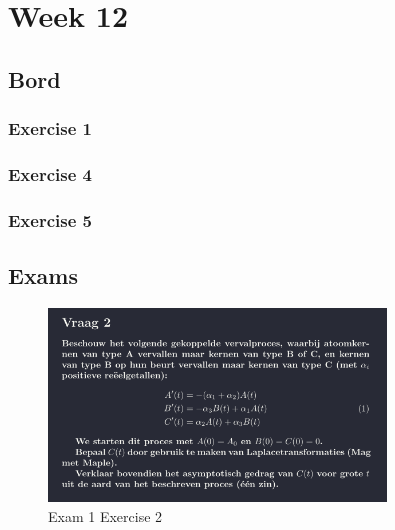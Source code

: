 \documentclass[a4paper]{report}
\begin{document}
\section{Week 12}

\subsection{Bord}

\subsubsection{Exercise 1}




\subsubsection{Exercise 4}




\subsubsection{Exercise 5}



\subsection{Exams}

\begin{figure}[H]
	\centering
	\includegraphics[width=0.8\textwidth]{assets/exam_1_ex_2.png}
	\caption{Exam 1 Exercise 2}
	\label{fig:exam_1_ex_2}
\end{figure}



\end{document}
